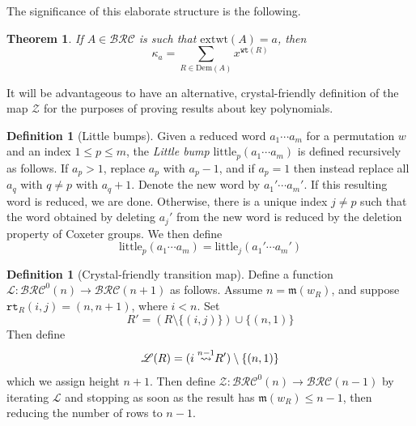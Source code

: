 \documentclass{amsart}
\newtheorem{theorem}{Theorem}[section]
\theoremstyle{definition}
\newtheorem{definition}[lemma]{Definition}
\theoremstyle{remark}
\numberwithin{equation}{subsection}
\newcommand{\wof}[1]{w_{#1}}
\newcommand{\wtt}{\mathtt{wt}}
\newcommand{\rtt}{\mathtt{rt}}
\newcommand{\zeromap}{\mathcal{Z}}
\newcommand{\BRC}{\mathcal{BRC}}
\newcommand{\lzeromap}{\mathscr{Z}}
\newcommand{\lmap}{\mathscr{L}}
\newcommand{\ltb}{\mathrm{little}}
\newcommand{\maxd}{\mathfrak{m}}
\begin{document}
The significance of this elaborate structure is the following.
\begin{theorem} \label{theorem:keykey}
If $A\in\BRC$ is such that $\mathrm{extwt}(A) = a$, then
$$\kappa_a = \sum_{R\in\mathrm{Dem}(A)} x^{\wtt(R)}$$
\end{theorem}

It will be advantageous to have an alternative, crystal-friendly definition of the map $\zeromap$ for the purposes of proving results about key polynomials.

\begin{definition}[Little bumps]
  Given a reduced word $a_1\cdots a_m$ for a permutation $w$ and an index $1\leq p\leq m$, the \emph{Little bump} $\ltb_p(a_1\cdots a_m)$ is defined recursively as follows. If $a_p>1$, replace $a_p$ with $a_p-1$, and if $a_p=1$ then instead replace all $a_q$ with $q\neq p$ with $a_q+1$. Denote the new word by $a_1'\cdots a_m'$. If this resulting word is reduced, we are done. Otherwise, there is a unique index $j\neq p$ such that the word obtained by deleting $a_j'$ from the new word is reduced by the deletion property of Coxeter groups. We then define
  $$\ltb_p(a_1\cdots a_m) = \ltb_j(a_1'\cdots a_m')$$
\end{definition}

\begin{definition}[Crystal-friendly transition map]
Define a function $\lmap:\BRC^0(n)\to\BRC(n+1)$ as follows. Assume $n=\maxd(\wof{R})$, and suppose $\rtt_R(i, j) = (n, n + 1)$, where $i < n$. Set 
$$R'= (R\setminus \{(i, j)\})\cup \{(n,1)\}$$
Then define
$$\lmap(R) = (\ins{n-1}{i} R')\setminus\{(n, 1)\}$$
which we assign height $n+1$. Then define $\lzeromap:\BRC^0(n)\to \BRC(n-1)$ by iterating $\lmap$ and stopping as soon as the result has $\maxd(\wof{R})\leq n-1$, then reducing the number of rows to $n-1$.
\end{definition}
\end{document}

